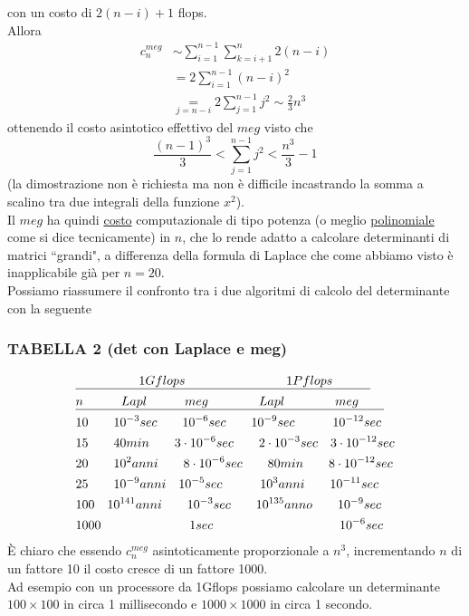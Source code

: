 \documentclass[12pt,a4paper]{article}
\begin{document}
con un costo di $2(n-i)+1$ flops.\\Allora
\begin{align*}
    c_n^{meg} &\sim\sum_{i=1}^{n-1}\sum_{k=i+1}^{n}2(n-i) \\
    & =2\sum_{i=1}^{n-1}(n-i)^2 \\
    & \underset{j=n-i}{=}2\sum_{j=1}^{n-1}j^2\sim \frac{2}{3}n^3
\end{align*}
ottenendo il costo asintotico effettivo del $meg$ visto che
\begin{equation*}
    \frac{(n-1)^3}{3}<\sum_{j=1}^{n-1}j^2<\frac{n^3}{3}-1
\end{equation*}
(la dimostrazione non è richiesta ma non è difficile incastrando la somma a scalino tra due integrali della funzione $x^2$).\\Il $meg$ ha quindi \uline{costo} computazionale di tipo potenza (o meglio \uline{polinomiale} come si dice tecnicamente) in $n$, che lo rende adatto a calcolare determinanti di matrici ``grandi", a differenza della formula di Laplace che come abbiamo visto è inapplicabile già per $n=20$.\\Possiamo riassumere il confronto tra i due algoritmi di calcolo del determinante con la seguente

\subsubsection{TABELLA 2 (det con Laplace e meg)}
\[ \begin{split}
	& \uline{\quad\quad\quad\quad \quad1Gflops\quad\quad \quad\quad\quad\quad\quad\quad1Pflops \quad\quad\quad }\\
	& \uline{n\quad\quad\quad Lapl\quad\quad\quad meg\quad\quad\quad\quad Lapl\quad\quad\quad\quad meg\quad\quad}\\
	&  10\quad\quad 10^{-3}sec\quad\quad 10^{-6}sec\quad\quad 10^{-9}sec\quad\quad\quad 10^{-12}sec\\
	&  15\quad\quad 40min\quad\quad 3\cdot10^{-6}sec\quad\quad 2\cdot10^{-3}sec\quad 3\cdot10^{-12}sec\\
	& 20\quad\quad 10^{2}anni\quad\quad 8\cdot10^{-6}sec\quad\quad 80min\quad\quad 8\cdot10^{-12}sec\\
	& 25\quad\quad 10^{-9}anni\quad 10^{-5}sec\quad\quad\quad 10^3anni\quad\quad 10^{-11}sec\\
	& 100\quad 10^{141}anni\quad\quad 10^{-3}sec\quad\quad 10^{135}anno\quad\quad 10^{-9}sec\\ 
	& 1000\quad\quad \quad\quad\quad\quad\quad 1sec\quad\quad\quad \quad\quad\quad\quad\quad\quad\quad10^{-6}sec\\ 
\end{split} \]
È chiaro che essendo $c_n^{meg}$ asintoticamente proporzionale a $n^3$, incrementando $n$ di un fattore 10 il costo cresce di un fattore 1000.\\Ad esempio con un processore da 1Gflops possiamo calcolare un determinante $100\times 100$ in circa 1 millisecondo e $1000\times 1000$ in circa 1 secondo.
\end{document}
